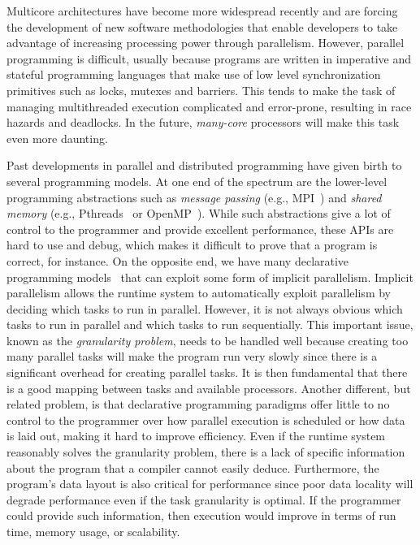 Multicore architectures have become more widespread recently and are forcing the
development of new software methodologies that enable developers to take
advantage of increasing processing power through parallelism. However, parallel
programming is difficult, usually because programs are written in imperative and
stateful programming languages that make use of low level synchronization
primitives such as locks, mutexes and barriers. This tends to make the task of
managing multithreaded execution complicated and error-prone, resulting in race
hazards and deadlocks. In the future, \emph{many-core} processors will make this
task even more daunting.

Past developments in parallel and distributed programming have given birth to
several programming models. At one end of the spectrum are the lower-level
programming abstractions such as \emph{message passing} (e.g.,
MPI~\cite{gabriel04-open-mpi}) and \emph{shared memory} (e.g.,
Pthreads~\cite{Butenhof:1997:PPT:263953} or
OpenMP~\cite{Chapman-2007-UOP-1370966}). While such abstractions give a lot of
control to the programmer and provide excellent performance, these APIs are hard
to use and debug, which makes it difficult to prove that a program is correct,
for instance. On the opposite end, we have many declarative programming
models~\cite{Blelloch:1996:PPA:227234.227246} that can exploit some form of
implicit parallelism. Implicit parallelism allows the runtime system to
automatically exploit parallelism by deciding which tasks to run in parallel.
However, it is not always obvious which tasks to run in parallel and which tasks
to run sequentially. This important issue, known as the \emph{granularity
problem}, needs to be handled well because creating too many parallel tasks will
make the program run very slowly since there is a significant overhead for
creating parallel tasks. It is then fundamental that there is a good mapping
between tasks and available processors.  Another different, but related problem,
is that declarative programming paradigms offer little to no control to the
programmer over how parallel execution is scheduled or how data is laid out,
making it hard to improve efficiency. Even if the runtime system reasonably
solves the granularity problem, there is a lack of specific information about
the program that a compiler cannot easily deduce. Furthermore, the program's
data layout is also critical for performance since poor data locality will
degrade performance even if the task granularity is optimal.  If the programmer
could provide such information, then execution would improve in terms of run
time, memory usage, or scalability.

